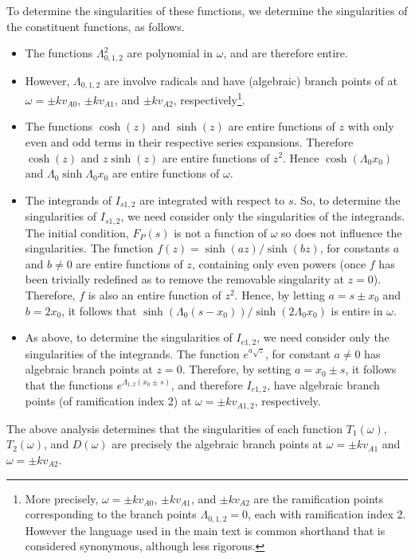 \documentclass{aastex61}
\begin{document}
To determine the singularities of these functions, we determine the singularities of the constituent functions, as follows.
\begin{itemize}
	\item The functions $\Lambda_{0,1,2}^2$ are polynomial in $\omega$, and are therefore entire.
	
	\item However, $\Lambda_{0,1,2}$ are involve radicals and have (algebraic) branch points of at $\omega = \pm kv_{A0}$, $\pm kv_{A1}$, and $\pm kv_{A2}$, respectively\footnote{More precisely, $\omega = \pm kv_{A0}$, $\pm kv_{A1}$, and $\pm kv_{A2}$ are the ramification points corresponding to the branch points $\Lambda_{0,1,2} = 0$, each with ramification index 2. However the language used in the main text is common shorthand that is considered synonymous, although less rigorous.}.
	
	\item The functions $\cosh(z)$ and $\sinh(z)$ are entire functions of $z$ with only even and odd terms in their respective series expansions. Therefore $\cosh(z)$ and $z\sinh(z)$ are entire functions of $z^2$. Hence $\cosh(\Lambda_0x_0)$ and $\Lambda_0\sinh{\Lambda_0x_0}$ are entire functions of $\omega$.
	
	\item The integrands of $I_{s1,2}$ are integrated with respect to $s$. So, to determine the singularities of $I_{s1,2}$, we need consider only the singularities of the integrands. The initial condition, $F_P(s)$ is not a function of $\omega$ so does not influence the singularities. The function $f(z) = \sinh(az) / \sinh(bz)$, for constants $a$ and $b \neq 0$ are entire functions of $z$, containing only even powers (once $f$ has been trivially redefined as to remove the removable singularity at $z=0$). Therefore, $f$ is also an entire function of $z^2$. Hence, by letting $a = s \pm x_0$ and $b = 2x_0$, it follows that $\sinh(\Lambda_0(s-x_0)) / \sinh(2\Lambda_0x_0)$ is entire in $\omega$.
	
	\item As above, to determine the singularities of $I_{e1,2}$, we need consider only the singularities of the integrands. The function $e^{a\sqrt{z}}$, for constant $a \neq 0$ has algebraic branch points at $z=0$. Therefore, by setting $a = x_0 \pm s$, it follows that the functions $e^{\Lambda_{1,2}(x_0 \pm s)}$, and therefore $I_{e1,2}$, have algebraic branch points (of ramification index 2) at $\omega = \pm kv_{A1,2}$, respectively.
\end{itemize}
The above analysis determines that the singularities of each function $T_1(\omega)$, $T_2(\omega)$, and $D(\omega)$ are precisely the algebraic branch points at $\omega = \pm kv_{A1}$ and $\omega = \pm kv_{A2}$.
\end{document}
